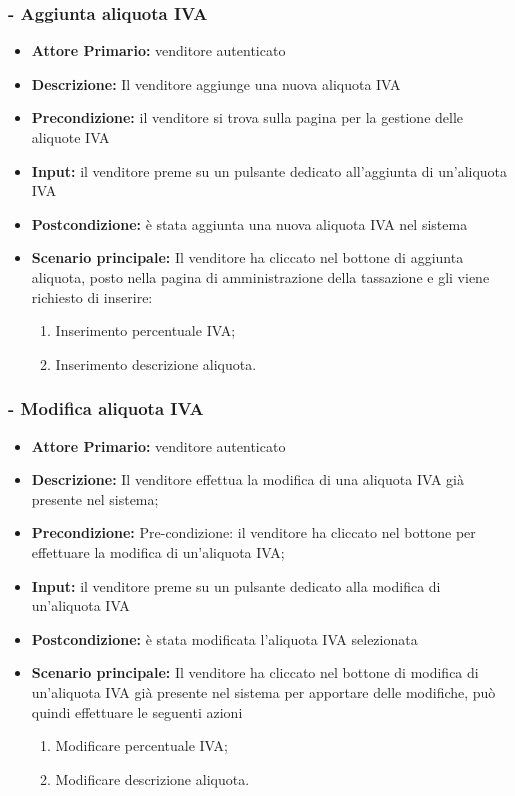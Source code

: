 \subsubsection{- Aggiunta aliquota IVA}
\begin{itemize}
    \item \textbf{Attore Primario:}  venditore autenticato
    \item \textbf{Descrizione:} Il venditore aggiunge una nuova aliquota IVA  
    \item \textbf{Precondizione:} il venditore si trova sulla pagina per la gestione delle aliquote IVA
    \item \textbf{Input:} il venditore preme su un pulsante dedicato all'aggiunta di un'aliquota IVA
    \item \textbf{Postcondizione:} è stata aggiunta una nuova aliquota IVA nel sistema
    \item \textbf{Scenario principale:} Il venditore ha cliccato nel bottone di aggiunta aliquota, posto nella pagina di amministrazione della tassazione e gli viene richiesto di inserire:
    \begin{enumerate}
        \item Inserimento percentuale IVA;
        \item Inserimento descrizione aliquota.
    \end{enumerate}
\end{itemize}

\stepsubUserCase
\subsubsection{- Modifica aliquota IVA}
\begin{itemize}
    \item \textbf{Attore Primario:}  venditore autenticato
    \item \textbf{Descrizione:} Il venditore effettua la modifica di una aliquota IVA già presente nel sistema;
    \item \textbf{Precondizione:} Pre-condizione: il venditore ha cliccato nel bottone per effettuare la modifica di un’aliquota IVA;
    \item \textbf{Input:} il venditore preme su un pulsante dedicato alla modifica di un'aliquota IVA
    \item \textbf{Postcondizione:} è stata modificata l'aliquota IVA selezionata
    \item \textbf{Scenario principale:} Il venditore ha cliccato nel bottone di modifica di un’aliquota IVA già presente nel sistema per apportare delle modifiche, può quindi effettuare le seguenti azioni
    \begin{enumerate}
        \item Modificare percentuale IVA;
        \item Modificare descrizione aliquota.
    \end{enumerate}
\end{itemize}

